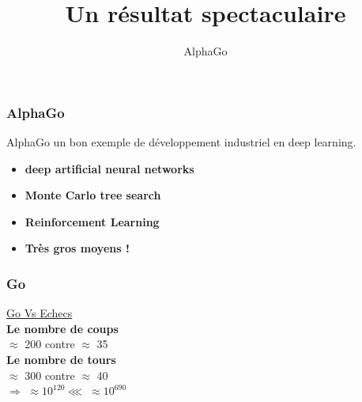 \documentclass{formation}
\title{Un résultat spectaculaire}
\subtitle{AlphaGo}
\begin{document}
\maketitle

\begin{frame}
  \frametitle{AlphaGo}
  AlphaGo un bon exemple de développement industriel en deep learning.
  \begin{itemize}
  \item \textbf{deep artificial neural networks}
  \item \textbf{Monte Carlo tree search}
  \item \textbf{Reinforcement Learning}
  \item \textbf{Très gros moyens !}    
  \end{itemize}
\end{frame}

\begin{frame}
  \frametitle{Go}
  \begin{minipage}[c]{0.6\linewidth}
  \end{minipage}\hfill
  \begin{minipage}[c]{0.33\linewidth}
    \begin{center}
      \underline{Go Vs Echecs} \\
      \textbf{Le nombre de coups} \\
      $\approx$ 200 contre $\approx$ 35 \\
      \textbf{Le nombre de tours} \\
      $\approx$ 300 contre $\approx$ 40 \\
      $\Rightarrow$ $\approx 10^{120}\lll \;\approx 10^{690}$
    \end{center}
  \end{minipage}\hfill
\end{frame}
\end{document}
